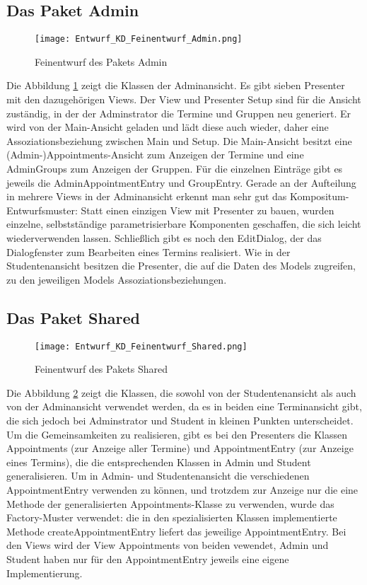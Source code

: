  \subsection{Das Paket Admin}
 \begin{figure}
  \texttt{[image: Entwurf\_KD\_Feinentwurf\_Admin.png]}
  \label{fig:Klassendiagramm_Admin}
  \caption{Feinentwurf des Pakets Admin}
 \end{figure}

 Die Abbildung \ref{fig:Klassendiagramm_Admin} zeigt die Klassen der Adminansicht. Es gibt sieben Presenter mit den dazugehörigen Views.
 Der View und Presenter Setup sind für die Ansicht zuständig, in der der Adminstrator die Termine und Gruppen neu generiert. Er wird von der Main-Ansicht geladen und lädt diese auch wieder, daher eine Assoziationsbeziehung zwischen Main und Setup.
 Die Main-Ansicht besitzt eine (Admin-)Appointments-Ansicht zum Anzeigen der Termine und eine AdminGroups zum Anzeigen der Gruppen.
 Für die einzelnen Einträge gibt es jeweils die AdminAppointmentEntry und GroupEntry.
 Gerade an der Aufteilung in mehrere Views in der Adminansicht erkennt man sehr gut das Kompositum-Entwurfsmuster: Statt einen einzigen View mit Presenter zu bauen, wurden einzelne, selbstständige parametrisierbare Komponenten geschaffen, die sich leicht wiederverwenden lassen.
 Schließlich gibt es noch den EditDialog, der das Dialogfenster zum Bearbeiten eines Termins realisiert.
 Wie in der Studentenansicht besitzen die Presenter, die auf die Daten des Models zugreifen, zu den jeweiligen Models Assoziationsbeziehungen.

 \subsection{Das Paket Shared}
 \begin{figure}
  \texttt{[image: Entwurf\_KD\_Feinentwurf\_Shared.png]}
  \label{fig:Klassendiagramm_Shared}
  \caption{Feinentwurf des Pakets Shared}
 \end{figure}

 Die Abbildung \ref{fig:Klassendiagramm_Shared} zeigt die Klassen, die sowohl von der Studentenansicht als auch von der Adminansicht verwendet werden, da es in beiden eine Terminansicht gibt, die sich jedoch bei Adminstrator und Student in kleinen Punkten unterscheidet.
 Um die Gemeinsamkeiten zu realisieren, gibt es bei den Presenters die Klassen Appointments (zur Anzeige aller Termine) und AppointmentEntry (zur Anzeige eines Termins), die die entsprechenden Klassen in Admin und Student generalisieren.
 Um in Admin- und Studentenansicht die verschiedenen AppointmentEntry verwenden zu können, und trotzdem zur Anzeige nur die eine Methode der generalisierten Appointments-Klasse zu verwenden, wurde das Factory-Muster verwendet: die in den spezialisierten Klassen implementierte Methode createAppointmentEntry liefert das jeweilige AppointmentEntry.
 Bei den Views wird der View Appointments von beiden vewendet, Admin und Student haben nur für den AppointmentEntry jeweils eine eigene Implementierung.

